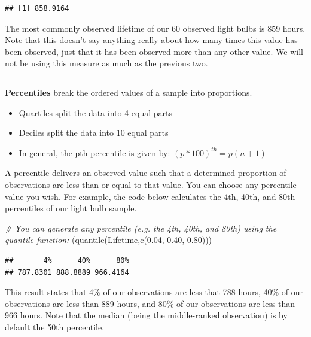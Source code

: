 \documentclass[
]{book}
\newenvironment{Shaded}{\begin{snugshade}}{\end{snugshade}}
\newcommand{\CommentTok}[1]{\textcolor[rgb]{0.56,0.35,0.01}{\textit{#1}}}
\newcommand{\FloatTok}[1]{\textcolor[rgb]{0.00,0.00,0.81}{#1}}
\newcommand{\FunctionTok}[1]{\textcolor[rgb]{0.00,0.00,0.00}{#1}}
\newcommand{\NormalTok}[1]{#1}
\begin{document}
\begin{verbatim}
## [1] 858.9164
\end{verbatim}

The most commonly observed lifetime of our 60 observed light bulbs is 859 hours. Note that this doesn't say anything really about how many times this value has been observed, just that it has been observed more than any other value. We will not be using this measure as much as the previous two.

\begin{center}\rule{0.5\linewidth}{0.5pt}\end{center}

\textbf{Percentiles} break the ordered values of a sample into proportions.

\begin{itemize}
\item
  Quartiles split the data into 4 equal parts
\item
  Deciles split the data into 10 equal parts
\item
  In general, the pth percentile is given by: \((p * 100)^{th}=p(n+1)\)
\end{itemize}

A percentile delivers an observed value such that a determined proportion of observations are less than or equal to that value. You can choose any percentile value you wish. For example, the code below calculates the 4th, 40th, and 80th percentiles of our light bulb sample.

\begin{Shaded}
\begin{Highlighting}[]
\CommentTok{\# You can generate any percentile (e.g. the 4th, 40th, and 80th) using the quantile function:}
\NormalTok{(}\FunctionTok{quantile}\NormalTok{(Lifetime,}\FunctionTok{c}\NormalTok{(}\FloatTok{0.04}\NormalTok{, }\FloatTok{0.40}\NormalTok{, }\FloatTok{0.80}\NormalTok{)))}
\end{Highlighting}
\end{Shaded}

\begin{verbatim}
##       4%      40%      80% 
## 787.8301 888.8889 966.4164
\end{verbatim}

This result states that 4\% of our observations are less that 788 hours, 40\% of our observations are less than 889 hours, and 80\% of our observations are less than 966 hours. Note that the median (being the middle-ranked observation) is by default the 50th percentile.
\end{document}
